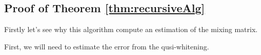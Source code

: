 \subsection{Proof of Theorem \ref{thm:recursiveAlg}}
Firstly let's see why this algorithm compute an estimation of the mixing matrix. 


First, we will need to estimate the error from the qusi-whitening. 
